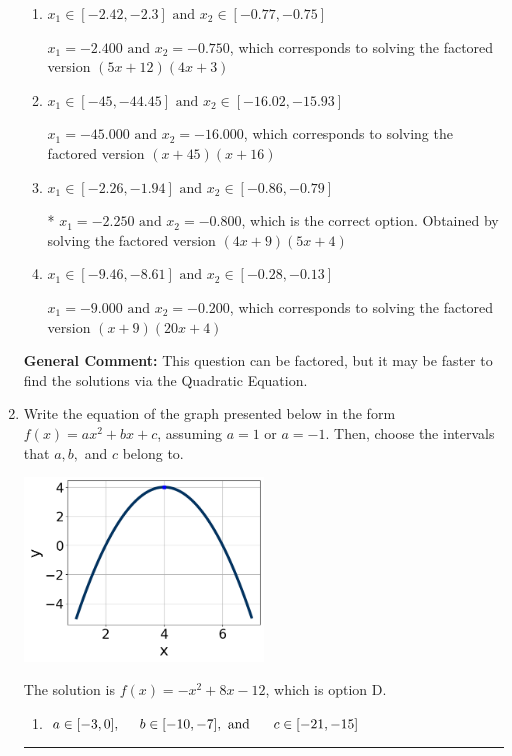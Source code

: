 \documentclass{extbook}[14pt]
\newcommand{\litem}[1]{\item #1

\rule{\textwidth}{0.4pt}}
\begin{document}
\begin{enumerate}
{\begin{enumerate}[label=\Alph*.]
$x_1 = -4.500 \text{ and } x_2 = -0.400$, which corresponds to solving the factored version $(4x + 18)(5x + 2)$
\item \( x_1 \in [-2.42, -2.3] \text{ and } x_2 \in [-0.77, -0.75] \)

$x_1 = -2.400 \text{ and } x_2 = -0.750$, which corresponds to solving the factored version $(5x + 12)(4x + 3)$
\item \( x_1 \in [-45, -44.45] \text{ and } x_2 \in [-16.02, -15.93] \)

$x_1 = -45.000 \text{ and } x_2 = -16.000$, which corresponds to solving the factored version $(x + 45)(x + 16)$
\item \( x_1 \in [-2.26, -1.94] \text{ and } x_2 \in [-0.86, -0.79] \)

* $x_1 = -2.250 \text{ and } x_2 = -0.800$, which is the correct option. Obtained by solving the factored version $(4x + 9)(5x + 4)$
\item \( x_1 \in [-9.46, -8.61] \text{ and } x_2 \in [-0.28, -0.13] \)

$x_1 = -9.000 \text{ and } x_2 = -0.200$, which corresponds to solving the factored version $(x + 9)(20x + 4)$
\end{enumerate}

\textbf{General Comment:} This question can be factored, but it may be faster to find the solutions via the Quadratic Equation.
}
\litem{
Write the equation of the graph presented below in the form $f(x)=ax^2+bx+c$, assuming  $a=1$ or $a=-1$. Then, choose the intervals that $a, b,$ and $c$ belong to.

\begin{center}
    \includegraphics[width=0.5\textwidth]{../Figures/quadraticGraphToEquationCopyC.png}
\end{center}


The solution is \( f(x) = -x^{2} +8 x -12 \), which is option D.\begin{enumerate}[label=\Alph*.]
\item \( a \in [-3, 0], \hspace*{5mm} b \in [-10, -7], \text{ and } \hspace*{5mm} c \in [-21, -15] \)


\end{enumerate}}
\end{enumerate}
\end{document}
